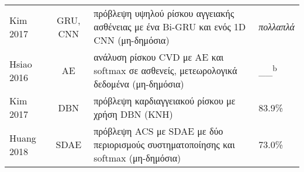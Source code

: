 \begin{sidewaystable}
\begin{tabular}{l c l l}
		Kim 2017~\cite{kim2017highrisk}                     & GRU, CNN        & πρόβλεψη υψηλού ρίσκου αγγειακής ασθένειας με ένα Bi-GRU και ενός 1D CNN (μη-δημόσια) & \textit{πολλαπλά}                                                                                                                                                                                                                                            \\
		Hsiao 2016~\cite{hsiao2016deep}                     & AE              & ανάλυση ρίσκου CVD με AE και softmax σε ασθενείς, μετεωρολογικά δεδομένα (μη-δημόσια)          & \_\_\textsuperscript{b}                                                                                                                                                                                                                                              \\
		Kim 2017~\cite{kim2017statistics}                   & DBN             & πρόβλεψη καρδιαγγειακού ρίσκου με χρήση DBN (KNH)                                                                   & 83.9\%                                                                                                                                                                                                                                                       \\
		Huang 2018~\cite{huang2018regularized}              & SDAE            & πρόβλεψη ACS με SDAE με δύο περιορισμούς συστηματοποίησης και softmax (μη-δημόσια)          & 73.0\%                                                                                                                                                                                                                                                       \\
		\bottomrule
	\end{tabular}
\end{sidewaystable}

